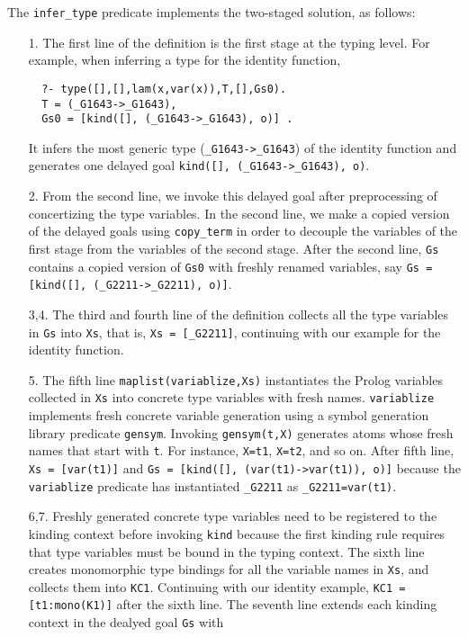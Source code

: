 \documentclass[runningheads,a4paper]{llncs}
\begin{document}
The \verb|infer_type| predicate implements the two-staged solution,
as follows:
\begin{itemize}
\item[1.]
The first line of the definition is the first stage at the typing level.
For example, when inferring a type for the identity function,
\begin{verbatim}
  ?- type([],[],lam(x,var(x)),T,[],Gs0).
  T = (_G1643->_G1643),
  Gs0 = [kind([], (_G1643->_G1643), o)] .
\end{verbatim}
It infers the most generic type (\verb|_G1643->_G1643|)
of the identity function and generates one delayed goal
\verb|kind([], (_G1643->_G1643), o)|.
\item[2.] From the second line,
we invoke this delayed goal after preprocessing of concertizing
the type variables. In the second line, we make a copied version of
the delayed goals using \verb|copy_term| in order to decouple
the variables of the first stage from the variables of the second stage.
After the second line, \verb|Gs| contains a copied version of \verb|Gs0|
with freshly renamed variables, say
\verb|Gs = [kind([], (_G2211->_G2211), o)]|.
\item[3,4.]
The third and fourth line of the definition collects all the type variables
in \verb|Gs| into \verb|Xs|, that is, \verb|Xs = [_G2211]|, continuing with
our example for the identity function.
\item[5.]
The fifth line \verb|maplist(variablize,Xs)| instantiates
the Prolog variables collected in \verb|Xs| into
concrete type variables with fresh names. \verb|variablize|
implements fresh concrete variable generation using
a symbol generation library predicate \verb|gensym|.
Invoking \verb|gensym(t,X)| generates atoms whose fresh names that
start with \verb|t|. For instance, \verb|X=t1|, \verb|X=t2|, and so on.
After fifth line, \verb|Xs = [var(t1)]| and
\verb|Gs = [kind([], (var(t1)->var(t1)), o)]| because 
the \verb|variablize| predicate has instantiated \verb|_G2211|
as \verb|_G2211=var(t1)|.
\item[6,7.] Freshly generated concrete type variables need to be
registered to the kinding context before invoking \verb|kind|
because the first kinding rule requires that type variables must be
bound in the typing context. The sixth line creates monomorphic
type bindings for all the variable names in \verb|Xs|, and collects
them into \verb|KC1|. Continuing with our identity example,
\verb|KC1 = [t1:mono(K1)]| after the sixth line. The seventh line
extends each kinding context in the dealyed goal \verb|Gs| with

\end{itemize}
\end{document}
